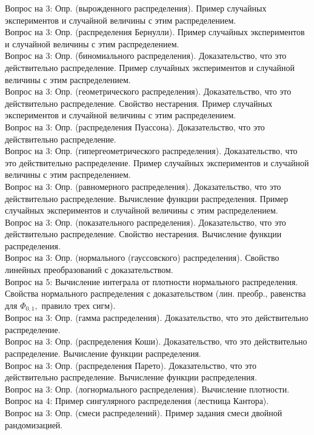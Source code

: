 \documentclass[10pt]{amsart}
\begin{document}
\begin{enumerate}
\begin{enumerate}
Вопрос на 3: Опр. (вырожденного распределения). Пример случайных экспериментов и случайной величины с этим распределением. \\
Вопрос на 3: Опр. (распределения Бернулли).  Пример случайных экспериментов и случайной величины с этим распределением. \\
Вопрос на 3:  Опр. (биномиального распределения). Доказательство, что это действительно распределение. Пример случайных экспериментов и случайной величины с этим распределением. \\     
Вопрос на 3:  Опр. (геометрического распределения). Доказательство, что это действительно распределение. Свойство нестарения. Пример случайных экспериментов и случайной величины с этим распределением. \\      
 Вопрос на 3:  Опр. (распределения Пуассона). Доказательство, что это действительно распределение. \\
Вопрос на 3: Опр. (гипергеометрического распределения). Доказательство, что это действительно распределение. Пример случайных экспериментов и случайной величины с этим распределением. \\      
Вопрос на 3:  Опр. (равномерного распределения). Доказательство, что это действительно распределение. Вычисление функции распределения. Пример случайных экспериментов и случайной величины с этим распределением. \\
Вопрос на 3: Опр. (показательного распределения). Доказательство, что это действительно распределение. Свойство нестарения. Вычисление функции распределения. \\  
Вопрос на 3: Опр. (нормального (гауссовского) распределения). Свойство линейных преобразований с доказательством. \\
Вопрос на 5: Вычисление интеграла от плотности нормального распределения.  Свойства нормального распределения с доказательством (лин. преобр., равенства для $\Phi_{0,1},$ правило трех сигм). \\
Вопрос на 3: Опр. (гамма распределения). Доказательство, что это действительно распределение. \\
Вопрос на 3: Опр. (распределения Коши). Доказательство, что это действительно распределение. Вычисление функции распределения. \\
Вопрос на 3: Опр. (распределения Парето). Доказательство, что это действительно распределение. Вычисление функции распределения. \\
Вопрос на 3: Опр. (логнормального распределения). Вычисление плотности. \\
Вопрос на 4:   Пример сингулярного распределения (лестница Кантора). \\
Вопрос на 3:  Опр. (смеси распределений). Пример задания смеси двойной рандомизацией. \\


\end{enumerate}
\end{enumerate}
\end{document}
